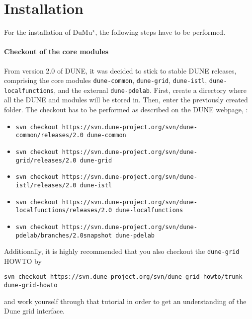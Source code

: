 \section{Installation} 
\label{install}

For the installation of DuMu$^\text{x}$, the following steps have to be performed.  

\paragraph{Checkout of the core modules}
From version 2.0 of DUNE, it was decided to stick to stable DUNE releases, comprising the core modules 
\texttt{dune-common}, \texttt{dune-grid}, \texttt{dune-istl}, \texttt{dune-localfunctions}, and the external \texttt{dune-pdelab}.  
First, create a directory where all the DUNE and \Dumux modules will be stored in. Then, enter the previously created folder. 
The checkout has to be performed as described on 
the DUNE webpage, \cite{DUNE-HP}: 
\begin{itemize}
\item \texttt{svn checkout https://svn.dune-project.org/svn/dune-common/releases/2.0 dune-common}
\item \texttt{svn checkout https://svn.dune-project.org/svn/dune-grid/releases/2.0 dune-grid}
\item \texttt{svn checkout https://svn.dune-project.org/svn/dune-istl/releases/2.0 dune-istl}
\item \texttt{svn checkout https://svn.dune-project.org/svn/dune-localfunctions/releases/2.0 dune-localfunctions}
\item \texttt{svn checkout https://svn.dune-project.org/svn/dune-pdelab/branches/2.0snapshot dune-pdelab}
\end{itemize} 

Additionally, it is highly recommended that you also checkout the \texttt{dune-grid} HOWTO 
by 
\begin{center}
\texttt{svn checkout https://svn.dune-project.org/svn/dune-grid-howto/trunk dune-grid-howto}
\end{center}
and work yourself through that tutorial in order to get an understanding of 
the Dune grid interface. 

